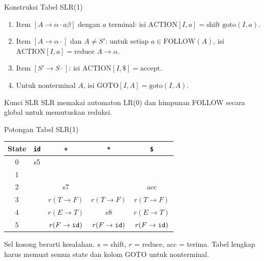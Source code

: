 \documentclass[aspectratio=169,10pt,t]{beamer}
\begin{document}
\begin{frame}{Konstruksi Tabel SLR(1)}
  \begin{enumerate}
    \setlength{\itemsep}{1pt}
    \item Item \([A \to \alpha \cdot a\beta]\) dengan \(a\) terminal:
          isi \(\text{ACTION}[I,a]=\text{shift goto}(I,a)\).
    \item Item \([A \to \alpha \cdot]\) dan \(A \neq S'\): untuk setiap
          \(a \in \text{FOLLOW}(A)\), isi
          \(\text{ACTION}[I,a]=\text{reduce } A \to \alpha\).
    \item Item \([S' \to S \cdot]\): isi
          \(\text{ACTION}[I,\$]=\text{accept}\).
    \item Untuk nonterminal \(A\), isi
          \(\text{GOTO}[I,A]=\text{goto}(I,A)\).
  \end{enumerate}

  \vspace{4pt}
  \begin{block}{Kunci SLR}
    \footnotesize
    SLR memakai automaton LR(0) dan himpunan FOLLOW secara global
    untuk memutuskan reduksi.
  \end{block}
\end{frame}

\begin{frame}{Potongan Tabel SLR(1)}
  \scriptsize
  \setlength{\tabcolsep}{5pt}
  \begin{tabular}{@{}c c c c c@{}}
    \toprule
    \textbf{State} & \texttt{id} & \texttt{+} & \texttt{*} &
      \texttt{\$} \\
    \midrule
    0 & s5 & & & \\
    1 & & & & \\
    2 & & s7 & & acc \\
    3 & & \(r(T \to F)\) & \(r(T \to F)\) & \(r(T \to F)\) \\
    4 & & \(r(E \to T)\) & s8 & \(r(E \to T)\) \\
    5 & & \(r(F \to \texttt{id})\) & \(r(F \to \texttt{id})\) &
      \(r(F \to \texttt{id})\) \\
    \bottomrule
  \end{tabular}

  \vspace{5pt}
  {\scriptsize\color{ubbblue!75}Sel kosong berarti kesalahan.
  \(s\) = shift, \(r\) = reduce, acc = terima. Tabel lengkap harus
  memuat semua state dan kolom GOTO untuk nonterminal.}
\end{frame}
\end{document}

